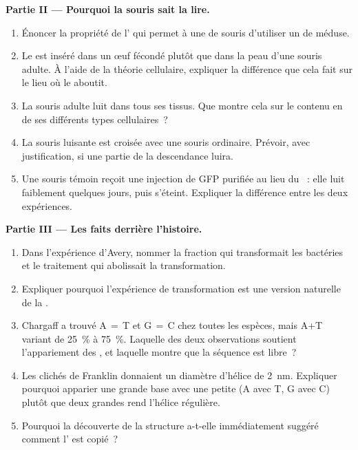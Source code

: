 \begin{problem}
\medskip
\noindent\textbf{Partie II --- Pourquoi la souris sait la lire.}
\begin{enumerate}[resume]
  \item Énoncer la propriété de l' qui permet à une  de
        souris d'utiliser un  de méduse.
  \item Le  est inséré dans un œuf fécondé plutôt que dans la peau
        d'une souris adulte. À l'aide de la théorie cellulaire,
        expliquer la différence que cela fait sur le lieu où le 
        aboutit.
  \item La souris adulte luit dans tous ses tissus. Que montre cela sur
        le contenu en  de ses différents types cellulaires~?
  \item La souris luisante est croisée avec une souris ordinaire.
        Prévoir, avec justification, si une partie de la descendance
        luira.
  \item Une souris témoin reçoit une injection de  GFP purifiée
        au lieu du ~: elle luit faiblement quelques jours, puis
        s'éteint. Expliquer la différence entre les deux expériences.
\end{enumerate}

\medskip
\noindent\textbf{Partie III --- Les faits derrière l'histoire.}
\begin{enumerate}[resume]
  \item Dans l'expérience d'Avery, nommer la fraction qui transformait
        les bactéries et le traitement qui abolissait la
        transformation.
  \item Expliquer pourquoi l'expérience de transformation est une
        version naturelle de la .
  \item Chargaff a trouvé A$\,=\,$T et G$\,=\,$C chez toutes les
        espèces, mais A+T variant de 25~\% à 75~\%. Laquelle des deux
        observations soutient l'appariement des , et laquelle
        montre que la séquence est libre~?
  \item Les clichés de Franklin donnaient un diamètre d'hélice de
        \qty{2}{nm}. Expliquer pourquoi apparier une grande base avec
        une petite (A avec T, G avec C) plutôt que deux grandes rend
        l'hélice régulière.
  \item Pourquoi la découverte de la structure a-t-elle immédiatement
        suggéré comment l' est copié~?
\end{enumerate}


\end{problem}
